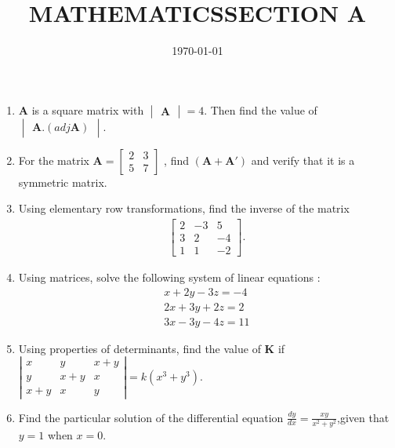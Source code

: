 \documentclass[12pt,-letter paper]{article}
\title{MATHEMATICS}
\title{SECTION A}
\date{\today}
\let\vec\mathbf{}
\let\vec\mathbf{}
\let\vec\mathbf{}
\providecommand{\mydet}[1]{\ensuremath{\begin{vmatrix}#1\end{vmatrix}}}
\providecommand{\brak}[1]{\ensuremath{\left(#1\right)}}
\begin{document}
\maketitle

\begin{enumerate}
\section{Algebra}
\item $ \vec{A} $ is a square matrix with $\mydet{\vec{A}} = 4 $. Then find the value of  $\mydet{ \vec{A} .\brak{adj \vec{A}}}$.

\item For the matrix $\vec{A} = \left[ \begin{array}{cc}2 & 3  \\ 5 & 7 \end{array} \right]$ , find $\brak{\vec{A} + \vec{A}'}$ and verify that it is a symmetric matrix.

\item Using elementary row transformations, find the inverse of the matrix
\begin{align*}
 \left[ \begin{array}{ccc}2 & -3 &5 \\ 3 & 2 & -4 \\ 1 & 1 & -2 \end{array}\right].   
\end{align*}

\item Using matrices, solve the following system of linear equations :
\begin{align*}
 x+2y-3z=-4\\
 2x+3y+2z=2\\
 3x-3y-4z=11
\end{align*}


\item Using properties of determinants, find the value of $\vec{K} $ if
$\left | \begin{array}{ccc}x & y & x+y \\ y & x+y & x \\ x+y & x & y \end{array}\right|=k\brak{x^{3}+y^{3}}$.



\item Find the particular solution of the differential equation $\frac{d y}{d x}=\frac{xy}{x^{2}+y^{2}}$,given that $y = 1$ when $x = 0$.


\end{enumerate}
\end{document}

